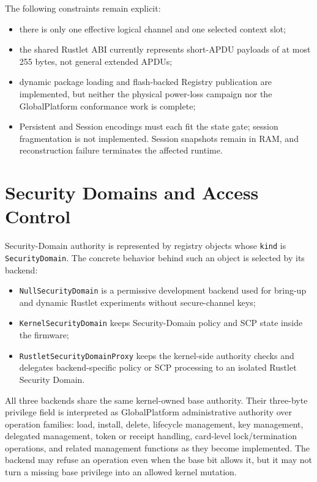 The following constraints remain explicit:
\begin{itemize}
\item there is only one effective logical channel and one selected context
  slot;
\item the shared Rustlet ABI currently represents short-APDU payloads of at
  most 255 bytes, not general extended APDUs;
\item dynamic package loading and flash-backed Registry publication are
  implemented, but neither the physical power-loss campaign nor the
  GlobalPlatform conformance work is complete;
\item Persistent and Session encodings must each fit the state gate;
  session fragmentation is not implemented. Session snapshots remain in RAM,
  and reconstruction failure terminates the affected runtime.
\end{itemize}

\section{Security Domains and Access Control}
\label{sec:impl-security-domain}

Security-Domain authority is represented by registry objects whose
\texttt{kind} is \texttt{SecurityDomain}. The concrete behavior behind such an
object is selected by its backend:
\begin{itemize}
\item \texttt{NullSecurityDomain} is a permissive development backend used for
  bring-up and dynamic Rustlet experiments without secure-channel keys;
\item \texttt{KernelSecurityDomain} keeps Security-Domain policy and SCP state
  inside the firmware;
\item \texttt{RustletSecurityDomainProxy} keeps the kernel-side authority
  checks and delegates backend-specific policy or SCP processing to an isolated
  Rustlet Security Domain.
\end{itemize}

All three backends share the same kernel-owned base authority. Their
three-byte privilege field is interpreted as GlobalPlatform administrative
authority over operation families: load, install, delete, lifecycle
management, key management, delegated management, token or receipt handling,
card-level lock/termination operations, and related management functions as
they become implemented. The backend may refuse an operation even when the base
bit allows it, but it may not turn a missing base privilege into an allowed
kernel mutation.

